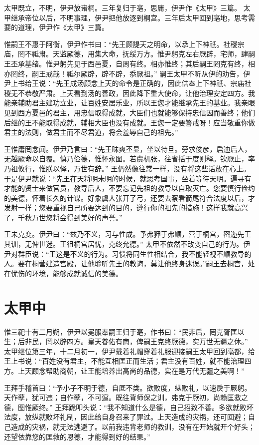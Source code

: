 \documentclass[12pt,UTF8]{ctexbook}
\begin{document}
太甲既立，不明，伊尹放诸桐。三年复归于亳，思庸，伊尹作《太甲》三篇。
太甲继承帝位以后，不明事理，伊尹把他放逐到桐宫。三年后太甲回到亳地，思考需要的道理，伊尹作《太甲》三篇。

惟嗣王不惠于阿衡，伊尹作书曰：“先王顾諟天之明命，以承上下神祇。社稷宗庙，罔不祗肃。天监厥德，用集大命，抚绥万方。惟尹躬克左右厥辟，宅师，肆嗣王丕承基绪。惟尹躬先见于西邑夏，自周有终。相亦惟终；其后嗣王罔克有终，相亦罔终，嗣王戒哉！祗尔厥辟，辟不辟，忝厥祖。”
嗣王太甲不听从伊的劝告，伊尹上书给王说：“先王成汤顾念上天的命令是正确的，因此供奉上下神祇、宗庙社稷无不恭敬严肃。上天看到汤的善政，因此降下重大使命，让他治理安定四方。我能亲辅助君主建功立业，让百姓安居乐业，所以王您才能继承先王的基业。我亲眼见到西方夏邑的君主，用忠信取得成就，大臣们也就能够保持忠信因而善终；他们后继的王不能取得成就，辅相大臣也没有成就。王您一定要警戒呀！应当敬重你做君主的法则，做君主而不尽君道，将会羞辱自己的祖先。”

王惟庸罔念闻。伊尹乃言曰：“先王昧爽丕显，坐以待旦。旁求俊彦，启迪后人，无越厥命以自覆。慎乃俭德，惟怀永图。若虞机张，往省括于度则释。钦厥止，率乃祖攸行，惟朕以怿，万世有辞。”
王仍然像往常一样，没有将这些话放在心上。于是伊尹就说：“先王在天将明未明的时候，就思考国事，坐着等待天明。遍寻有才能的贤士来做官员，教导后人，不要忘记先祖的教导以自取灭亡。您要慎行俭约的美德，怀着长久的计谋。好象虞人张开了弓，还要去察看箭尾符合法度以后，才发射一样；您要重视自己所要达到的目的，遵行你的祖先的措施！这样我就高兴了，千秋万世您将会得到美好的声誉。”

王未克变。伊尹曰：“兹乃不义，习与性成。予弗狎于弗顺，营于桐宫，密迩先王其训，无俾世迷。王徂桐宫居忧，克终允德。”
太甲不依然不改变自己的行为。伊尹对群臣说：“王这是不义的行为。习惯将同生性相结合，我不能轻视不顺教导的人。要在桐营建造宫殿，让他聆听先王的教诲，莫让他终身迷误。”嗣王去桐宫，处在忧伤的环境，能够成就诚信的美德。

\chapter{太甲中}

惟三祀十有二月朔，伊尹以冕服奉嗣王归于亳，作书曰：“民非后，罔克胥匡以生；后非民，罔以辟四方。皇天眷佑有商，俾嗣王克终厥德，实万世无疆之休。”
太甲继位第三年，十二月初一，伊尹戴着礼帽穿着礼服迎接嗣王太甲回到亳都，给王上书说：“百姓没有君主，不能互相匡正而生活；君主没有百姓，就不能治理四方。上天顾念帮助商朝，让王能培养出高尚的品德，实在是万代无疆之美啊！”

王拜手稽首曰：“予小子不明于德，自厎不类。欲败度，纵败礼，以速戾于厥躬。天作孽，犹可违；自作孽，不可逭。既往背师保之训，弗克于厥初，尚赖匡救之德，图惟厥终。”
王拜跪叩头说：“我不知道什么是德，自己招致不善。多欲就败坏法度，放纵就败坏礼制，因此给自身召来了罪过。上天造成的灾祸，还可回避；自己造成的灾祸，就无法逃避了。以前我违背老师的教训，没有在开始就开个好头；还望依靠您的匡救的恩德，才能得到好的结果。”
\end{document}

